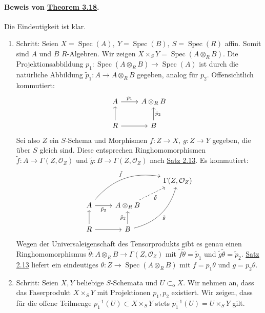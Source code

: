 \paragraph{Beweis von \hyperref[3.18]{Theorem 3.18}.} Die Eindeutigkeit ist klar.
\begin{enumerate}
\item Schritt: Seien $X=\operatorname{Spec}(A),\ Y=\operatorname{Spec}(B),\ S=\operatorname{Spec}(R)$ affin. Somit sind $A$ und $B$ $R$-Algebren. Wir zeigen $X\times_S Y=\operatorname{Spec}(A\otimes_R B)$. Die Projektionsabbildung $p_1:\operatorname{Spec}(A\otimes_RB)\to \operatorname{Spec}(A)$ ist durch die natürliche Abbildung $\tilde{p}_1:A\to A\otimes_RB$ gegeben, analog für $p_2$. Offensichtlich kommutiert:
\[\begin{tikzcd}
 A\ar[r, "\tilde{p}_1"] & A\otimes_RB\\
 R\ar[r]\ar[u] & B\ar[u, "\tilde{p}_2"']
\end{tikzcd} \]
Sei also $Z$ ein $S$-Schema und Morphismen $f:Z\to X,\ g:Z\to Y$ gegeben, die über $S$ gleich sind. Diese entsprechen Ringhomomorphismen $\tilde{f}:A\to\Gamma(Z,\mathcal{O}_Z)$ und $\tilde{g}:B\to\Gamma(Z,\mathcal{O}_Z)$ nach \hyperref[2.13]{Satz 2.13}. Es kommutiert:
\[\begin{tikzcd}
&&\Gamma(Z,\mathcal{O}_Z)\\
A\ar[r, "\tilde{p}_2"']\ar[rru, "\tilde{f}", bend left]& A\otimes_RB\ar[ru, "\tilde{\theta}"', dashed] &\\
R\ar[r]\ar[u] & B\ar[u, "\tilde{p}_2"]\ar[ruu, "\tilde{g}"', bend right]
\end{tikzcd} \]
Wegen der Universaleigenschaft des Tensorprodukts gibt es genau einen Ringhomomorphismus $\tilde{\theta}:A\otimes_RB\to\Gamma(Z,\mathcal{O}_Z)$ mit $\tilde{f}\tilde{\theta}=\tilde{p}_1$ und $\tilde{g}\tilde{\theta}=\tilde{p}_2$. \hyperref[2.13]{Satz 2.13} liefert ein eindeutiges $\theta:Z\to\operatorname{Spec}(A\otimes_RB)$ mit $f=p_1\theta$ und $g=p_2\theta$.
\item Schritt: Seien $X,Y$ beliebige $S$-Schemata und $U\subset_\text{o}X$. Wir nehmen an, dass das Faserprodukt $X\times_SY$ mit Projektionen $p_1,p_2$ existiert. Wir zeigen, dass für die offene Teilmenge $p_1^{-1}(U)\subset X\times_SY$ stets $p_1^{-1}(U)=U\times_SY$ gilt.


\end{enumerate}
